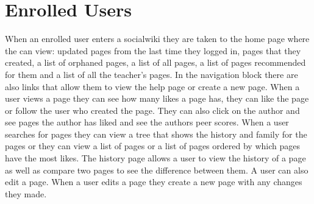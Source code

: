 \documentclass[letterpaper,twoside,12pt]{report}
\begin{document}
	\section{Enrolled Users}
	When an enrolled user enters a socialwiki they are taken to the home page where the can view: updated pages from the last time they logged in, pages that they created, a list of orphaned pages, a list of all pages, a list of pages recommended for them and a list of all the teacher's pages. In the navigation block there are also links that allow them to view the help page or create a new page.
	When a user views a page they can see how many likes a page has, they can like the page or follow the user who created the page. They can also click on the author and see pages the author has liked and see the authors peer scores. 
	When a user searches for pages they can view a tree that shows the history and family for the pages or they can view a list of pages or a list of pages ordered by which pages have the most likes.
	The history page allows a user to view the history of a page as well as compare two pages to see the difference between them. 
	A user can also edit a page. When a user edits a page they create a new page with any changes they made. 
	
\end{document}
